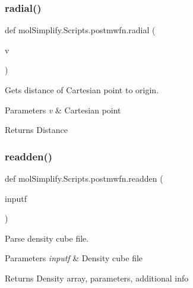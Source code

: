 \subsubsection{\texorpdfstring{radial()}{radial()}}
{\footnotesize\ttfamily def mol\+Simplify.\+Scripts.\+postmwfn.\+radial (\begin{DoxyParamCaption}\item[{}]{v }\end{DoxyParamCaption})}



Gets distance of Cartesian point to origin. 


\begin{DoxyParams}{Parameters}
{\em v} & Cartesian point \\
\hline
\end{DoxyParams}
\begin{DoxyReturn}{Returns}
Distance 
\end{DoxyReturn}
\mbox{\label{namespacemolSimplify_1_1Scripts_1_1postmwfn_a959558b8a0ce7ce7fcf7068235e5065b}} 
\subsubsection{\texorpdfstring{readden()}{readden()}}
{\footnotesize\ttfamily def mol\+Simplify.\+Scripts.\+postmwfn.\+readden (\begin{DoxyParamCaption}\item[{}]{inputf }\end{DoxyParamCaption})}



Parse density cube file. 


\begin{DoxyParams}{Parameters}
{\em inputf} & Density cube file \\
\hline
\end{DoxyParams}
\begin{DoxyReturn}{Returns}
Density array, parameters, additional info 
\end{DoxyReturn}
\mbox{\label{namespacemolSimplify_1_1Scripts_1_1postmwfn_aaf11b91ca1c7ad0bacc396aee9f93f9e}} 
